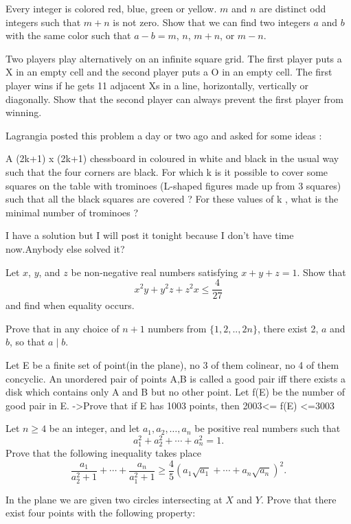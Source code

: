 Every integer is colored red, blue, green or yellow. $m$ and $n$ are distinct odd integers such that $m + n$ is not zero. Show that we can find two integers $a$ and $b$ with the same color such that $a - b = m$, $n$, $m + n$, or $m - n$.
\eq

Two players play alternatively on an infinite square grid. The first player puts a X in an empty cell and the second player puts a O in an empty cell. The first player wins if he gets 11 adjacent Xs in a line, horizontally, vertically or diagonally. Show that the second player can always prevent the first player from winning.
\eq

\bq{}{}
Lagrangia posted this problem a day or two ago and asked for some ideas :

A (2k+1) x (2k+1) chessboard in coloured in white and black in the usual way such that the four corners are black. For which k is it possible to cover some squares on the table with trominoes (L-shaped figures made up from 3 squares) such that all the black squares are covered ? For these values of k , what is the minimal number of trominoes ?

I have a solution but I will post it tonight because I don't have time now.Anybody else solved it?
\eq

Let $ x$, $ y$, and $ z$ be non-negative real numbers satisfying $ x + y + z = 1$. Show that
\[ x^2 y + y^2 z + z^2 x \leq \frac {4}{27} \]
and find when equality occurs.
\eq

\bq{}{}
Prove that in any choice of $n+1$ numbers from $\{1,2,..,2n\}$, there exist 2, $a$ and $b$, so that $a \mid b$.
\eq

\bq{}{}
Let E be a finite set of point(in the plane), no 3
of them colinear, no 4 of them concyclic. An unordered
pair of points {A,B} is called a good pair iff there exists
a disk which contains only A and B but no other point.
Let f(E) be the number of good pair in E.
->Prove that if E has 1003 points, then
2003<= f(E) <=3003
\eq

Let $n\geq 4$ be an integer, and let $a_1,a_2,\ldots,a_n$ be positive real numbers such that \[ a_1^2+a_2^2+\cdots +a_n^2=1 . \] Prove that the following inequality takes place \[ \frac{a_1}{a_2^2+1}+\cdots +\frac{a_n}{a_1^2+1} \geq \frac{4}{5}\left( a_1 \sqrt{a_1}+\cdots +a_n \sqrt{a_n} \right)^2 . \]
\eq

In the plane we are given two circles intersecting at $ X$ and $ Y$. Prove that there exist four points with the following property:

